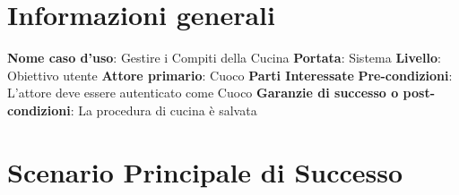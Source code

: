 
\section*{Informazioni generali}
\textbf{Nome caso d'uso}{: Gestire i Compiti della Cucina}\newline
\textbf{Portata}{: Sistema}\newline
\textbf{Livello}{: Obiettivo utente}\newline
\textbf{Attore primario}{: Cuoco}\newline
\textbf{Parti Interessate}\newline
\textbf{Pre-condizioni}{: L'attore deve essere autenticato come Cuoco}\newline
\textbf{Garanzie di successo o post-condizioni}{: La procedura di cucina è salvata}

\section*{Scenario Principale di Successo}
\def\arraystretch{1.50}
